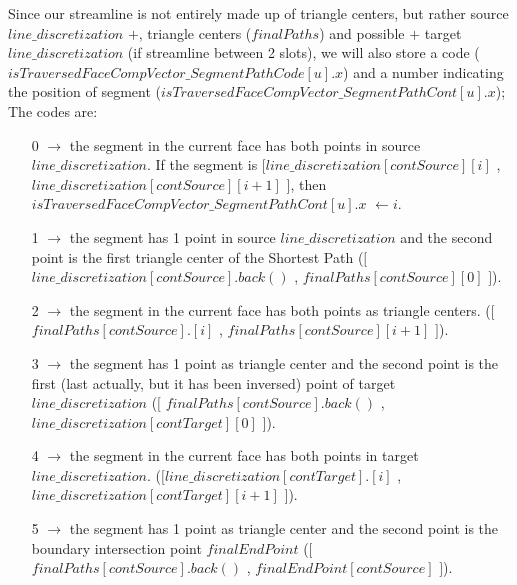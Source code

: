 \documentclass[a4paper]{report}
\begin{document}
{{		Since our streamline is not entirely made up of triangle centers, but rather source \textcolor{myGreen}{$line\_discretization$} $+$, triangle centers (\textcolor{myGreen}{$finalPaths$}) and possible $+$ target \textcolor{myGreen}{$line\_discretization$} (if streamline between 2 slots), we will also store a code (\textcolor{myGreen}{$isTraversedFaceCompVector\_SegmentPathCode[u].x$}) and a number indicating the position of segment (\textcolor{myGreen}{$isTraversedFaceCompVector\_SegmentPathCont[u].x$}); The codes are:
		\begin{itemize}
		\item[0] $\rightarrow$ the segment in the current face has both points in source \textcolor{myGreen}{$line\_discretization$}. If the segment is $[$\textcolor{myGreen}{$line\_discretization[contSource][i]$} , \textcolor{myGreen}{$line\_discretization[contSource][i+1]$} $]$, then \textcolor{myGreen}{$isTraversedFaceCompVector\_SegmentPathCont[u].x$ $\leftarrow i$}.
		\item[1] $\rightarrow$ the segment has 1 point in source \textcolor{myGreen}{$line\_discretization$} and the second point is the first triangle center of the Shortest Path ($[$\textcolor{myGreen}{$line\_discretization[contSource].back()$} , \textcolor{myGreen}{$finalPaths[contSource][0]$} $]$).
		\item[2] $\rightarrow$ the segment in the current face has both points as triangle centers. ($[$\textcolor{myGreen}{$finalPaths[contSource].[i]$} , \textcolor{myGreen}{$finalPaths[contSource][i+1]$} $]$).
		\item[3] $\rightarrow$ the segment has 1 point  as triangle center and the second point is the first (last actually, but it has been inversed) point of target \textcolor{myGreen}{$line\_discretization$} ($[$ \textcolor{myGreen}{$finalPaths[contSource].back()$} , \textcolor{myGreen}{$line\_discretization[contTarget][0]$}  $]$).
		\item[4]$\rightarrow$ the segment in the current face has both points in target \textcolor{myGreen}{$line\_discretization$}. ($[$\textcolor{myGreen}{$line\_discretization[contTarget].[i]$} , \textcolor{myGreen}{$line\_discretization[contTarget][i+1]$} $]$).
		\item[5] $\rightarrow$ the segment has 1 point  as triangle center and the second point is the boundary intersection point \textcolor{myGreen}{$finalEndPoint$} ($[$ \textcolor{myGreen}{$finalPaths[contSource].back()$} , \textcolor{myGreen}{$finalEndPoint[contSource]$}  $]$).
		\end{itemize}
 
}}
\end{document}
